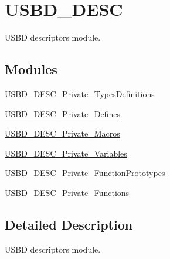 \hypertarget{group__USBD__DESC}{}\section{U\+S\+B\+D\+\_\+\+D\+E\+SC}
\label{group__USBD__DESC}


U\+S\+BD descriptors module.  


\subsection*{Modules}
\begin{DoxyCompactItemize}
\item 
\hyperlink{group__USBD__DESC__Private__TypesDefinitions}{U\+S\+B\+D\+\_\+\+D\+E\+S\+C\+\_\+\+Private\+\_\+\+Types\+Definitions}
\item 
\hyperlink{group__USBD__DESC__Private__Defines}{U\+S\+B\+D\+\_\+\+D\+E\+S\+C\+\_\+\+Private\+\_\+\+Defines}
\item 
\hyperlink{group__USBD__DESC__Private__Macros}{U\+S\+B\+D\+\_\+\+D\+E\+S\+C\+\_\+\+Private\+\_\+\+Macros}
\item 
\hyperlink{group__USBD__DESC__Private__Variables}{U\+S\+B\+D\+\_\+\+D\+E\+S\+C\+\_\+\+Private\+\_\+\+Variables}
\item 
\hyperlink{group__USBD__DESC__Private__FunctionPrototypes}{U\+S\+B\+D\+\_\+\+D\+E\+S\+C\+\_\+\+Private\+\_\+\+Function\+Prototypes}
\item 
\hyperlink{group__USBD__DESC__Private__Functions}{U\+S\+B\+D\+\_\+\+D\+E\+S\+C\+\_\+\+Private\+\_\+\+Functions}
\end{DoxyCompactItemize}


\subsection{Detailed Description}
U\+S\+BD descriptors module. 

